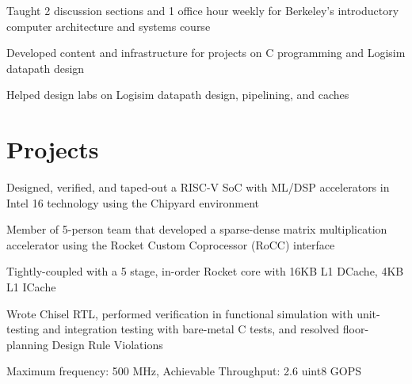 \documentclass[]{deedy-resume-openfont}
\begin{document}
\vspace{\topsep} %
\begin{tightemize}
\item Taught 2 discussion sections and 1 office hour weekly for Berkeley's introductory computer architecture and systems course
\item Developed content and infrastructure for projects on C programming and Logisim datapath design
\item Helped design labs on Logisim datapath design, pipelining, and caches
\end{tightemize}
\sectionsep

\pagebreak

\section{Projects}

\begin{tightemize}
\item Designed, verified, and taped-out a RISC-V SoC with ML/DSP accelerators in Intel 16 technology using the Chipyard environment 
\item Member of 5-person team that developed a sparse-dense matrix multiplication accelerator using the Rocket Custom Coprocessor (RoCC) interface
\item Tightly-coupled with a 5 stage, in-order Rocket core with 16KB L1 DCache, 4KB L1 ICache
\item Wrote Chisel RTL, performed verification in functional simulation with unit-testing and integration testing with bare-metal C tests, and resolved floor-planning Design Rule Violations
\item Maximum frequency: 500 MHz, Achievable Throughput: 2.6 uint8 GOPS
\end{tightemize}
\sectionsep


\end{document}

